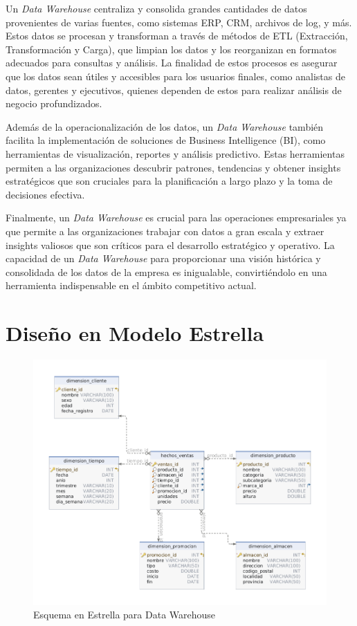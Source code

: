 \documentclass{article}
\begin{document}
Un \textit{Data Warehouse} centraliza y consolida grandes cantidades de datos provenientes de varias fuentes, como sistemas ERP, CRM, archivos de log, y más. Estos datos se procesan y transforman a través de métodos de ETL (Extracción, Transformación y Carga), que limpian los datos y los reorganizan en formatos adecuados para consultas y análisis. La finalidad de estos procesos es asegurar que los datos sean útiles y accesibles para los usuarios finales, como analistas de datos, gerentes y ejecutivos, quienes dependen de estos para realizar análisis de negocio profundizados.

Además de la operacionalización de los datos, un \textit{Data Warehouse} también facilita la implementación de soluciones de Business Intelligence (BI), como herramientas de visualización, reportes y análisis predictivo. Estas herramientas permiten a las organizaciones descubrir patrones, tendencias y obtener insights estratégicos que son cruciales para la planificación a largo plazo y la toma de decisiones efectiva.

Finalmente, un \textit{Data Warehouse} es crucial para las operaciones empresariales ya que permite a las organizaciones trabajar con datos a gran escala y extraer insights valiosos que son críticos para el desarrollo estratégico y operativo. La capacidad de un \textit{Data Warehouse} para proporcionar una visión histórica y consolidada de los datos de la empresa es inigualable, convirtiéndolo en una herramienta indispensable en el ámbito competitivo actual.

\newpage
\section*{Diseño en Modelo Estrella}
\begin{figure}[ht]
    \centering
    \includegraphics[width=\textwidth]{star-schema.png}
    \caption{Esquema en Estrella para Data Warehouse}
\end{figure}
\end{document}
